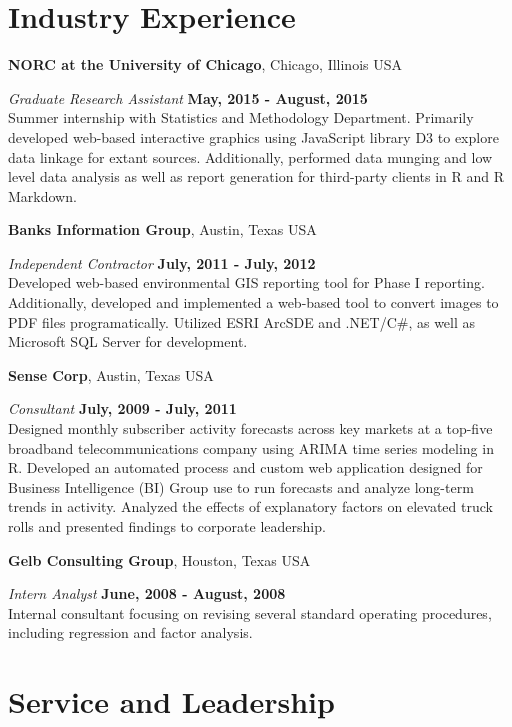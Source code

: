 \documentclass[margin,line]{res}
\begin{document}
\begin{resume}
\section{\sc Industry Experience}
{\bf NORC at the University of Chicago}, Chicago, Illinois USA

\vspace{-.3cm}
{\em Graduate Research Assistant} \hfill {\bf May, 2015 - August, 2015}\\
Summer internship with Statistics and Methodology Department. Primarily developed web-based interactive graphics using JavaScript library D3 to explore data linkage for extant sources. Additionally, performed data munging and low level data analysis as well as report generation for third-party clients in R and R Markdown.

{\bf Banks Information Group}, Austin, Texas USA

\vspace{-.3cm}
{\em Independent Contractor} \hfill {\bf July, 2011 - July, 2012}\\
Developed web-based environmental GIS reporting tool for Phase I reporting. Additionally, developed and implemented a web-based tool to convert images to PDF files programatically.  Utilized ESRI ArcSDE and .NET/C\#, as well as Microsoft SQL Server for development.

{\bf Sense Corp}, Austin, Texas USA

\vspace{-.3cm}
{\em Consultant} \hfill {\bf July, 2009 - July, 2011}\\
Designed monthly subscriber activity forecasts across key markets at a top-five broadband telecommunications company using ARIMA time series modeling in R. Developed an automated process and custom web application designed for Business Intelligence (BI) Group use to run forecasts and analyze long-term trends in activity. Analyzed the effects of explanatory factors on elevated truck rolls and presented findings to corporate leadership.

{\bf Gelb Consulting Group}, Houston, Texas USA

\vspace{-.3cm}
{\em Intern Analyst} \hfill {\bf  June, 2008 - August, 2008}\\
Internal consultant focusing on revising several standard operating procedures, including regression and factor analysis. 

\section{\sc Service and Leadership}


\end{resume}
\end{document}
